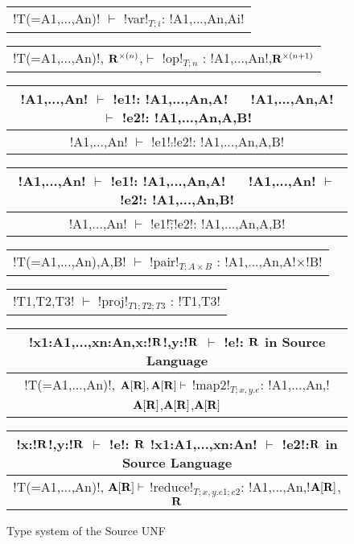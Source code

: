 \begin{figure*}[tb]
    \centering
    \begin{tabular}{c} 
    \\\hline
    !T(=A1,...,An)! $\vdash$ !var!$_{T;i}$: !A1,...,An,Ai!
    \end{tabular}
    \hspace{0.5cm}
    \begin{tabular}{c}
        \\\hline
        !T(=A1,...,An)!, $\mathbf{R}^{\times(n)}$,$\vdash$ !op!$_{T;n}$ : !A1,...,An!,$\mathbf{R}^{\times(n+1)}$
    \end{tabular}

    \begin{tabular}{c}
    !A1,...,An! $\vdash$ !e1!: !A1,...,An,A! $\quad$ !A1,...,An,A! $\vdash$ !e2!: !A1,...,An,A,B! \\\hline
    !A1,...,An! $\vdash$ !e1!$\comp$!e2!: !A1,...,An,A,B!
    \end{tabular}
    \hspace{0.5cm}
    \begin{tabular}{c}
        !A1,...,An! $\vdash$ !e1!: !A1,...,An,A! $\quad$ !A1,...,An! $\vdash$ !e2!: !A1,...,An,B! \\\hline
        !A1,...,An! $\vdash$ !e1!$\widetilde{;}$!e2!: !A1,...,An,A,B!
    \end{tabular}

    \begin{tabular}{c}
        \\\hline
        !T(=A1,...,An),A,B! $\vdash$ !pair!$_{T;A\times B}$ : !A1,...,An,A!$\times$!B!
    \end{tabular}

    \begin{tabular}{c}
        \\\hline
        !T1,T2,T3! $\vdash$ !proj!$_{T1;T2;T3}$ : !T1,T3!
    \end{tabular}

    \begin{tabular}{c}
        !x1:A1,...,xn:An,x:!$\mathbf{R}$!,y:!$\mathbf{R}$ $\vdash$ !e!: $\mathbf{R}$ \quad in Source Language
        \\\hline  
        !T(=A1,...,An)!, $\mathbf{A}[\mathbf{R}],\mathbf{A}[\mathbf{R}] \vdash$ !map2!$_{T; x,y.e}$: !A1,...,An,!$\mathbf{A}[\mathbf{R}]$,$\mathbf{A}[\mathbf{R}]$,$\mathbf{A}[\mathbf{R}]$
    \end{tabular}

    \begin{tabular}{c}
        !x:!$\mathbf{R}$!,y:!$\mathbf{R}$ $\vdash$ !e!: $\mathbf{R}$ \quad !x1:A1,...,xn:An! $\vdash$ !e2!:$\mathbf{R}$ \quad in Source Language
        \\\hline  
        !T(=A1,...,An)!, $\mathbf{A}[\mathbf{R}] \vdash$ !reduce!$_{T; x,y.e1; e2}$: !A1,...,An,!$\mathbf{A}[\mathbf{R}]$,$\mathbf{R}$
    \end{tabular}
    \vspace{-0.2cm}
    \caption{Type system of the Source UNF}
    \vspace{-0.4cm}
    \label{fig:source_unf_typesystem}
\end{figure*}